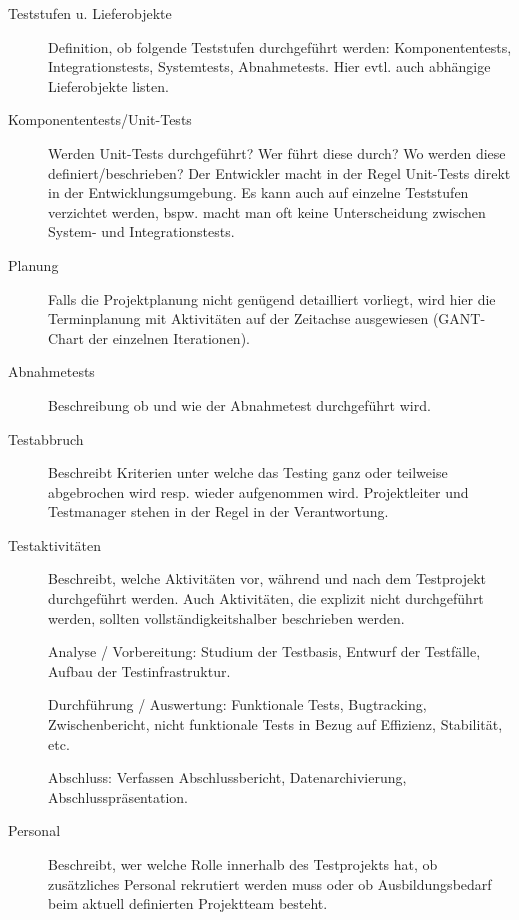 \begin{description}
	\item[Teststufen u. Lieferobjekte] Definition, ob folgende Teststufen durchgeführt werden: Komponententests, Integrationstests, Systemtests, Abnahmetests.  Hier evtl. auch abhängige Lieferobjekte listen.
	
	\item[Komponententests/Unit-Tests] Werden Unit-Tests durchgeführt? Wer führt diese durch? Wo werden diese definiert/beschrieben? Der Entwickler macht in der Regel Unit-Tests direkt in der Entwicklungsumgebung. Es kann auch auf einzelne Teststufen verzichtet werden, bspw. macht man oft keine Unterscheidung zwischen System- und Integrationstests.
	
	\item[Planung] Falls die Projektplanung nicht genügend detailliert vorliegt, wird hier die Terminplanung mit Aktivitäten auf der Zeitachse ausgewiesen (GANT-Chart der einzelnen Iterationen).
	
	\item[Abnahmetests] Beschreibung ob und wie der Abnahmetest durchgeführt wird.
	
	\item[Testabbruch] Beschreibt Kriterien unter welche das Testing ganz oder teilweise abgebrochen wird resp. wieder aufgenommen wird. Projektleiter und Testmanager stehen in der Regel in der Verantwortung.
	
	\item[Testaktivitäten] Beschreibt, welche Aktivitäten vor, während und nach dem Testprojekt durchgeführt werden. Auch Aktivitäten, die explizit nicht durchgeführt werden, sollten vollständigkeitshalber beschrieben werden.
	
	\subitem Analyse / Vorbereitung: Studium der Testbasis, Entwurf der Testfälle, Aufbau der Testinfrastruktur.
	
	\subitem Durchführung / Auswertung: Funktionale Tests, Bugtracking, Zwischenbericht, nicht funktionale Tests in Bezug auf Effizienz, Stabilität, etc.
	
	\subitem Abschluss: Verfassen Abschlussbericht, Datenarchivierung, Abschlusspräsentation.
	
	\item[Personal] Beschreibt, wer welche Rolle innerhalb des Testprojekts hat, ob zusätzliches Personal rekrutiert werden muss oder ob Ausbildungsbedarf beim aktuell definierten Projektteam besteht.
	
\end{description}

